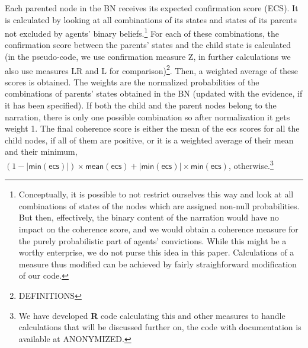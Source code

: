 \documentclass[
  10pt,
]{scrartcl}
\newcommand{\s}[1]{\textsf{#1}}
\begin{document}
Each parented node in the BN receives its expected confirmation score (\s{ECS}). It is calculated by looking at all combinations of its states and states of its parents not excluded by agents' binary beliefs.\footnote{Conceptually, it is possible to not restrict ourselves this way and look at all combinations of states of the nodes which are assigned non-null probabilities. But then, effectively, the binary content of the narration would have no impact on the coherence score, and we would obtain a coherence measure for the purely probabilistic part of agents' convictions. While this might be a worthy enterprise, we do not purse this idea in this paper. Calculations of a measure thus modified can be achieved by fairly straighforward modification of our code.} For each of these combinations, the confirmation score between the parents' states and the child state is calculated (in the pseudo-code, we use confirmation measure \s{Z}, in further calculations we also use measures \s{LR} and \s{L} for comparison)\footnote{DEFINITIONS}. Then, a weighted average of these scores is obtained. The weights are the normalized probabilities of the combinations of parents' states obtained in the BN (updated with the evidence, if it has been specified). If both the child and the parent nodes belong to the narration, there is only one possible combination so after normalization it gets weight 1. The final coherence score is either the mean of the \s{ecs} scores for all the child nodes, if all of them are positive, or it is a weighted average of their mean and their minimum, \((1- |\s{min}(\s{ecs})|) \times \s{mean}(\s{ecs}) + |\s{min}(\s{ecs})| \times \s{min}(\s{ecs})\), otherwise.\footnote{We have developed \textbf{\textsf{R}} code calculating this and other measures to handle calculations that will be discussed further on, the code with documentation is available at ANONYMIZED.}

\pagebreak 
\footnotesize
\end{document}
